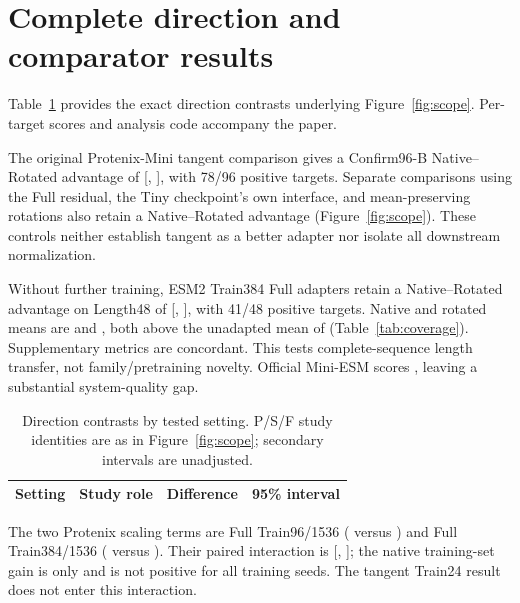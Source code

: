 \section{Complete direction and comparator results}
\label{app:complete_results}
Table~\ref{tab:scope_full} provides the exact direction contrasts underlying
Figure~\ref{fig:scope}. Per-target scores and analysis code accompany the paper.

The original Protenix-Mini tangent comparison gives a Confirm96-B
Native--Rotated advantage of 
[, ], with 78/96 positive targets.
Separate comparisons using the Full residual, the Tiny checkpoint's own
interface, and mean-preserving rotations also retain a Native--Rotated
advantage (Figure~\ref{fig:scope}). These controls neither establish tangent
as a better adapter nor isolate all downstream normalization.

Without further training, ESM2 Train384 Full adapters retain a
Native--Rotated advantage on Length48 of 
[, ], with 41/48 positive targets.
Native and rotated means are  and
, both above the unadapted mean of
 (Table~\ref{tab:coverage}). Supplementary metrics
are concordant. This tests complete-sequence length transfer, not
family/pretraining novelty. Official Mini-ESM scores
, leaving a substantial system-quality gap.

\begin{table}[h]
\caption{Direction contrasts by tested setting. P/S/F study identities are as
in Figure~\ref{fig:scope}; secondary intervals are unadjusted.}
\label{tab:scope_full}\centering\scriptsize
\begin{tabular}{lcrr}\toprule
Setting & Study role & Difference & 95\% interval \\\midrule

\end{tabular}
\end{table}

The two Protenix scaling terms are Full Train96/1536
( versus ) and Full
Train384/1536 ( versus ).
Their paired interaction is 
[, ]; the native training-set gain is
only  and is not positive for all training seeds.
The tangent Train24 result does not enter this interaction.

